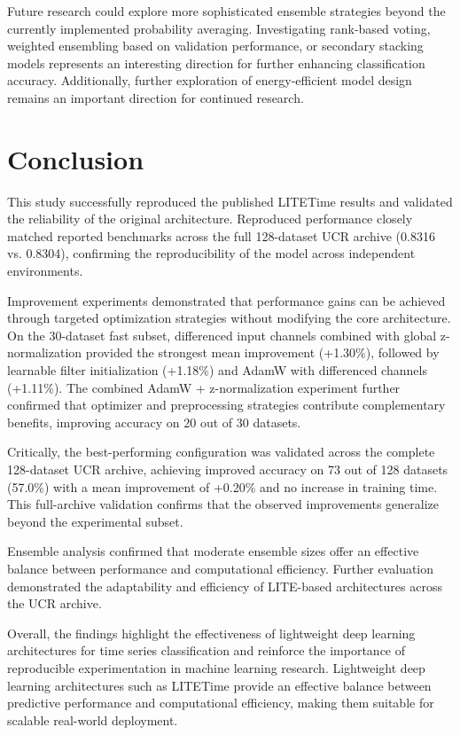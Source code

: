 \documentclass[conference]{IEEEtran}
\begin{document}
Future research could explore more sophisticated ensemble strategies beyond the currently implemented probability averaging. Investigating rank-based voting, weighted ensembling based on validation performance, or secondary stacking models represents an interesting direction for further enhancing classification accuracy. Additionally, further exploration of energy-efficient model design remains an important direction for continued research.


\section{Conclusion}

This study successfully reproduced the published LITETime results and validated the reliability of the original architecture. Reproduced performance closely matched reported benchmarks across the full 128-dataset UCR archive (0.8316 vs. 0.8304), confirming the reproducibility of the model across independent environments.

Improvement experiments demonstrated that performance gains can be achieved through targeted optimization strategies without modifying the core architecture. On the 30-dataset fast subset, differenced input channels combined with global z-normalization provided the strongest mean improvement (+1.30\%), followed by learnable filter initialization (+1.18\%) and AdamW with differenced channels (+1.11\%). The combined AdamW + z-normalization experiment further confirmed that optimizer and preprocessing strategies contribute complementary benefits, improving accuracy on 20 out of 30 datasets.

Critically, the best-performing configuration was validated across the complete 128-dataset UCR archive, achieving improved accuracy on 73 out of 128 datasets (57.0\%) with a mean improvement of +0.20\% and no increase in training time. This full-archive validation confirms that the observed improvements generalize beyond the experimental subset.

Ensemble analysis confirmed that moderate ensemble sizes offer an effective balance between performance and computational efficiency. Further evaluation demonstrated the adaptability and efficiency of LITE-based architectures across the UCR archive.

Overall, the findings highlight the effectiveness of lightweight deep learning architectures for time series classification and reinforce the importance of reproducible experimentation in machine learning research. Lightweight deep learning architectures such as LITETime provide an effective balance between predictive performance and computational efficiency, making them suitable for scalable real-world deployment.
\end{document}
